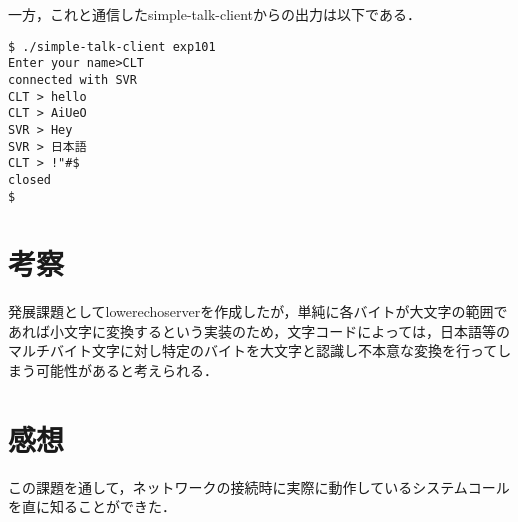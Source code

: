 \documentclass[a4j,10pt,titlepage]{jsarticle}
\begin{document}
一方，これと通信したsimple-talk-clientからの出力は以下である．
\begin{verbatim}
$ ./simple-talk-client exp101
Enter your name>CLT
connected with SVR
CLT > hello
CLT > AiUeO
SVR > Hey
SVR > 日本語
CLT > !"#$
closed
$
\end{verbatim}

\section{考察}
発展課題としてlowerechoserverを作成したが，単純に各バイトが大文字の範囲であれば小文字に変換するという実装のため，文字コードによっては，日本語等のマルチバイト文字に対し特定のバイトを大文字と認識し不本意な変換を行ってしまう可能性があると考えられる．

\section{感想}
この課題を通して，ネットワークの接続時に実際に動作しているシステムコールを直に知ることができた．
\end{document}
